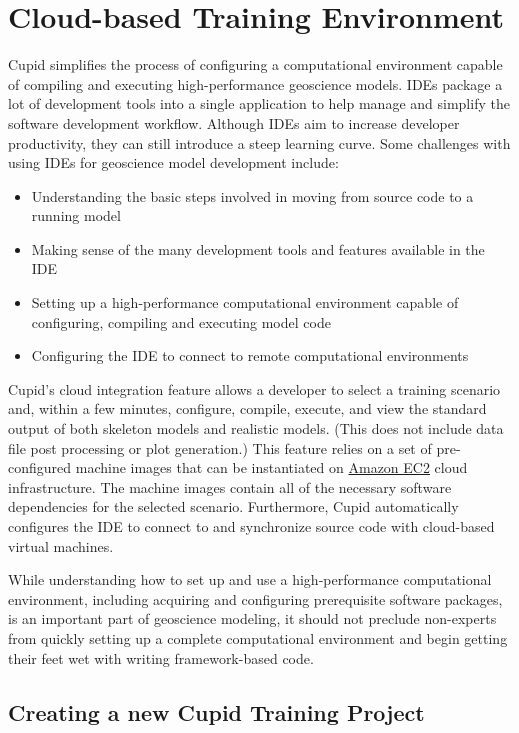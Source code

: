 \documentclass[oneside,11pt]{memoir}
\begin{document}
\chapter{Cloud-based Training Environment}

Cupid simplifies the process of configuring a computational environment capable of compiling and executing high-performance geoscience models. IDEs package a lot of development tools into a single application to help manage and simplify the software development workflow. Although IDEs aim to increase developer productivity, they can still introduce a steep learning curve. Some challenges with using IDEs for geoscience model development include:

\begin{itemize}
\item Understanding the basic steps involved in moving from source code to a running model
\item Making sense of the many development tools and features available in the IDE
\item Setting up a high-performance computational environment capable of configuring, compiling and executing model code
\item Configuring the IDE to connect to remote computational environments
\end{itemize}

Cupid's cloud integration feature allows a developer to select a training scenario and, within a few minutes, configure, compile, execute, and view the standard output of both skeleton models and realistic models. (This does not include data file post processing or plot generation.) This feature relies on a set of pre-configured machine images that can be instantiated on \href{http://aws.amazon.com/ec2/}{Amazon EC2} cloud infrastructure. The machine images contain all of the necessary software dependencies for the selected scenario. Furthermore, Cupid automatically configures the IDE to connect to and synchronize source code with cloud-based virtual machines.

While understanding how to set up and use a high-performance computational environment, including acquiring and configuring prerequisite software packages, is an important part of geoscience modeling, it should not preclude non-experts from quickly setting up a complete computational environment and begin getting their feet wet with writing framework-based code.

\section{Creating a new Cupid Training Project}
\label{sec:cupidwizard}
\end{document}
